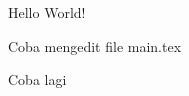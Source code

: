 \documentclass{article}
\begin{document}
  
  Hello World!
  
  Coba mengedit file main.tex  
  
  Coba lagi
\end{document}
